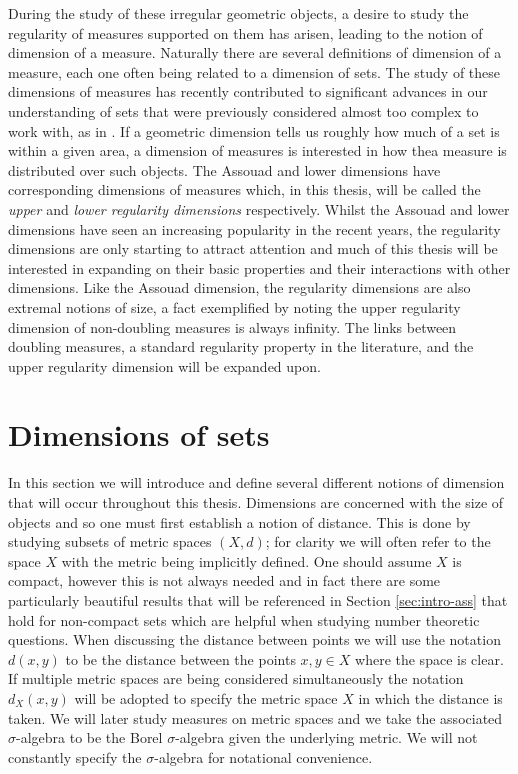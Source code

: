 During the study of these irregular geometric objects, a desire to study the regularity of measures supported on them has arisen, leading to the notion of dimension of a measure. Naturally there are several definitions of dimension of a measure, each one often being related to a dimension of sets. The study of these dimensions of measures has recently contributed to significant advances in our understanding of sets that were previously considered almost too complex to work with, as in \cite{hochman}. If a geometric dimension tells us roughly how much of a set is within a given area, a dimension of measures is interested in how thea measure is distributed over such objects. The Assouad and lower dimensions have corresponding dimensions of measures which, in this thesis, will be called the \textit{upper} and \textit{lower regularity dimensions} respectively. Whilst the Assouad and lower dimensions have seen an increasing popularity in the recent years, the regularity dimensions are only starting to attract attention and much of this thesis will be interested in expanding on their basic properties and their interactions with other dimensions. Like the Assouad dimension, the regularity dimensions are also extremal notions of size, a fact exemplified by noting the upper regularity dimension of non-doubling measures is always infinity. The links between doubling measures, a standard regularity property in the literature, and the upper regularity dimension will be expanded upon. 





\section{Dimensions of sets}
\label{sec:intro-sets}

In this section we will introduce and define several different notions of dimension that will occur throughout this thesis. Dimensions are concerned with the size of objects and so one must first establish a notion of distance. This is done by studying subsets of metric spaces $(X,d)$; for clarity we will often refer to the space $X$ with the metric being implicitly defined. One should assume $X$ is compact, however this is not always needed and in fact there are some particularly beautiful results that will be referenced in Section \ref{sec:intro-ass} that hold for non-compact sets which are helpful when studying number theoretic questions. When discussing the distance between points we will use the notation $d(x,y)$ to be the distance between the points $x,y \in X$ where the space is clear. If multiple metric spaces are being considered simultaneously the notation $d_X(x,y)$ will be adopted to specify the metric space $X$ in which the distance is taken. We will later study measures on metric spaces and we take the associated $\sigma$-algebra to be the Borel $\sigma$-algebra given the underlying metric. We will not constantly specify the $\sigma$-algebra for notational convenience.

